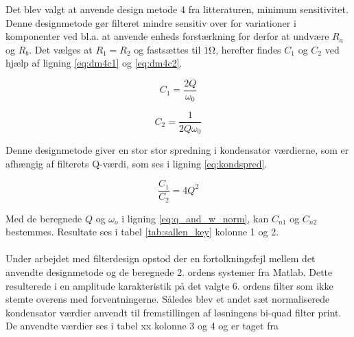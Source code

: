 Det blev valgt at anvende design metode 4 fra litteraturen, minimum sensitivitet.
Denne designmetode gør filteret mindre sensitiv over for variationer i komponenter ved bl.a.
at anvende enheds forstærkning for derfor at undvære $R_a$ og $R_b$.
Det vælges at $R_1 = R_2$ og fastsættes til $1\si{\ohm}$, herefter findes $C_1$ og $C_2$ ved hjælp af ligning \ref{eq:dm4c1} og \ref{eq:dm4c2}.

\vspace{15pt}

\begin{minipage}{0.5\linewidth}
	\begin{equation}
	\label{eq:dm4c1}
	C_1 = \frac{2Q}{\omega_0}
	\end{equation}
\end{minipage}
\begin{minipage}{0.5\linewidth}
	\begin{equation}
	\label{eq:dm4c2}
	C_2 = \frac{1}{2Q\omega_0}
	\end{equation}
\end{minipage}

\vspace{15pt}

Denne designmetode giver en stor stor spredning i kondensator værdierne, som er afhængig af filterets Q-værdi, som ses i ligning
\ref{eq:kondspred}.

\begin{equation}
\label{eq:kondspred}
\frac{C_1}{C_2} = 4Q^2
\end{equation}

Med de beregnede $Q$ og $\omega_o$ i ligning \ref{eq:q_and_w_norm}, kan $C_{n1}$ og $C_{n2}$ bestemmes.
Resultate ses i tabel \ref{tab:sallen_key} kolonne 1 og 2.
\\
\\
Under arbejdet med filterdesign opstod der en fortolkningsfejl mellem det anvendte designmetode og de beregnede 2. ordens systemer fra Matlab.
Dette resulterede i en amplitude karakteristik på det valgte 6. ordens filter som ikke stemte overens med forventningerne.
Således blev et andet sæt normaliserede kondensator værdier anvendt til fremstillingen af løsningens bi-quad filter print.
De anvendte værdier ses i tabel xx kolonne 3 og 4 og er taget fra \cite[Table B-2: Capacitor Values for 0.1-dB Chebyshev lowpass Sallen-Key filters, n=6]{sk_data_web}

